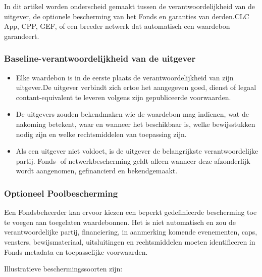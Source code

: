 \documentclass[11pt]{article}
\begin{document}
In dit artikel worden onderscheid gemaakt tussen de verantwoordelijkheid van de uitgever, de optionele bescherming van het Fonds en garanties van derden.CLC App, CPP, GEF, of een breeder netwerk dat automatisch een waardebon garandeert.

\subsubsection*{Baseline-verantwoordelijkheid van de uitgever}

\begin{itemize}[leftmargin=*]
\item Elke waardebon is in de eerste plaats de verantwoordelijkheid van zijn uitgever.De uitgever verbindt zich ertoe het aangegeven goed, dienst of legaal contant-equivalent te leveren volgens zijn gepubliceerde voorwaarden.
\item De uitgevers zouden bekendmaken wie de waardebon mag indienen, wat de nakoming betekent, waar en wanneer het beschikbaar is, welke bewijsstukken nodig zijn en welke rechtsmiddelen van toepassing zijn.
\item Als een uitgever niet voldoet, is de uitgever de belangrijkste verantwoordelijke partij. Fonds- of netwerkbescherming geldt alleen wanneer deze afzonderlijk wordt aangenomen, gefinancierd en bekendgemaakt.
\end{itemize}
\subsubsection*{Optioneel Poolbescherming}

Een Fondsbeheerder kan ervoor kiezen een beperkt gedefinieerde bescherming toe te voegen aan toegelaten waardebonnen. Het is niet automatisch en zou de verantwoordelijke partij, financiering, in aanmerking komende evenementen, caps, vensters, bewijsmateriaal, uitsluitingen en rechtsmiddelen moeten identificeren in Fonds metadata en toepasselijke voorwaarden.

Illustratieve beschermingssoorten zijn:
\end{document}

